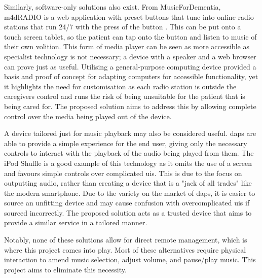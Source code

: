 Similarly, software-only solutions also exist. From MusicForDementia, m4dRADIO is a web application with preset buttons that tune into online radio stations that run 24/7 with the press of the button \citep{UtleyRadio2026}. This can be put onto a touch screen tablet, so the patient can tap onto the button and listen to music of their own volition. This form of media player can be seen as more accessible as specialist technology is not necessary; a device with a speaker and a web browser can prove just as useful. Utilising a general-purpose computing device provided a basis and proof of concept for adapting computers for accessible functionality, yet it highlights the need for customisation as each radio station is outside the caregivers control and runs the risk of being unsuitable for the patient that is being cared for. The proposed solution aims to address this by allowing complete control over the media being played out of the device.

A device tailored just for music playback may also be considered useful. \gls{dap}s are able to provide a simple experience for the end user, giving only the necessary controls to interact with the playback of the audio being played from them. The iPod Shuffle is a good example of this technology as it omits the use of a screen and favours simple controls over complicated \gls{ui}s. This is due to the focus on outputting audio, rather than creating a device that is a "jack of all trades" like the modern smartphone. Due to the variety on the market of \gls{dap}s, it is easier to source an unfitting device and may cause confusion with overcomplicated \gls{ui}s if sourced incorrectly. The proposed solution acts as a trusted device that aims to provide a similar service in a tailored manner.

Notably, none of these solutions allow for direct remote management, which is where this project comes into play. Most of these alternatives require physical interaction to amend music selection, adjust volume, and pause/play music. This project aims to eliminate this necessity.

